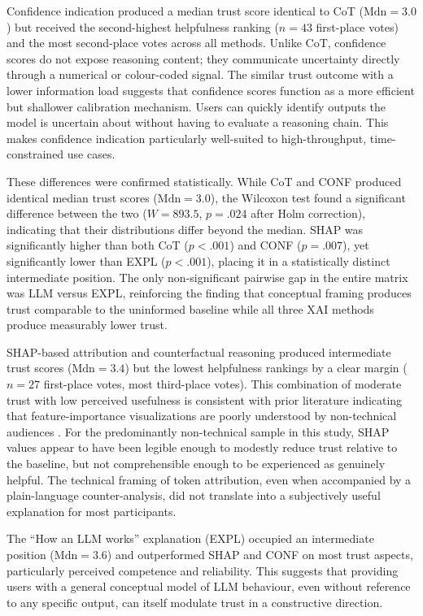 Confidence indication produced a median trust score identical to CoT ($\text{Mdn} = 3.0$) but received the second-highest helpfulness ranking ($n = 43$ first-place votes) and the most second-place votes across all methods. Unlike CoT, confidence scores do not expose reasoning content; they communicate uncertainty directly through a numerical or colour-coded signal. The similar trust outcome with a lower information load suggests that confidence scores function as a more efficient but shallower calibration mechanism. Users can quickly identify outputs the model is uncertain about without having to evaluate a reasoning chain. This makes confidence indication particularly well-suited to high-throughput, time-constrained use cases.

These differences were confirmed statistically. While CoT and CONF produced identical
median trust scores ($\text{Mdn} = 3.0$), the Wilcoxon test found a significant difference
between the two ($W = 893.5$, $p = .024$ after Holm correction), indicating that their
distributions differ beyond the median. SHAP was significantly higher than both CoT
($p < .001$) and CONF ($p = .007$), yet significantly lower than EXPL ($p < .001$),
placing it in a statistically distinct intermediate position. The only non-significant
pairwise gap in the entire matrix was LLM versus EXPL, reinforcing the finding that
conceptual framing produces trust comparable to the uninformed baseline while all three
XAI methods produce measurably lower trust.

SHAP-based attribution and counterfactual reasoning produced intermediate trust scores ($\text{Mdn} = 3.4$) but the lowest helpfulness rankings by a clear margin ($n = 27$ first-place votes, most third-place votes). This combination of moderate trust with low perceived usefulness is consistent with prior literature indicating that feature-importance visualizations are poorly understood by non-technical audiences \cite{chromik_i_2021, kaur_interpreting_2020}. For the predominantly non-technical sample in this study, SHAP values appear to have been legible enough to modestly reduce trust relative to the baseline, but not comprehensible enough to be experienced as genuinely helpful. The technical framing of token attribution, even when accompanied by a plain-language counter-analysis, did not translate into a subjectively useful explanation for most participants.

The ``How an LLM works'' explanation (EXPL) occupied an intermediate position ($\text{Mdn} = 3.6$) and outperformed SHAP and CONF on most trust aspects, particularly perceived competence and reliability. This suggests that providing users with a general conceptual model of LLM behaviour, even without reference to any specific output, can itself modulate trust in a constructive direction.

